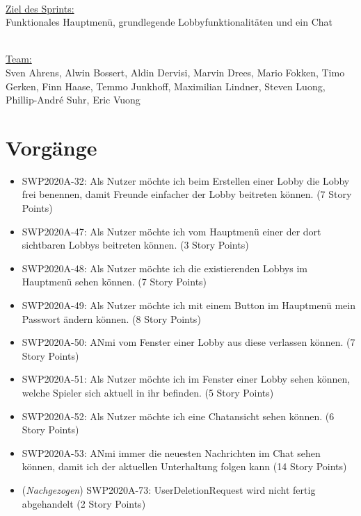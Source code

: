 \documentclass[12pt,a4paper, oneside]{article}
\begin{document}
    \noindent
    \\
    \underline{Ziel des Sprints:}
    \\
    Funktionales Hauptmenü, grundlegende Lobbyfunktionalitäten und ein Chat

    \noindent
    \\
    \underline {Team:}
    \\
    Sven Ahrens, Alwin Bossert, Aldin Dervisi, Marvin Drees, Mario Fokken,
    Timo Gerken, Finn Haase, Temmo Junkhoff, Maximilian Lindner, Steven Luong, Phillip-André Suhr, Eric Vuong


    \section{Vorgänge}

    \begin{itemize}

        \item SWP2020A-32: Als Nutzer möchte ich beim Erstellen einer Lobby die Lobby frei benennen, damit Freunde einfacher der Lobby beitreten können. (7 Story Points)

        \item SWP2020A-47: Als Nutzer möchte ich vom Hauptmenü einer der dort sichtbaren Lobbys beitreten können. (3 Story Points)

        \item SWP2020A-48: Als Nutzer möchte ich die existierenden Lobbys im Hauptmenü sehen können. (7 Story Points)

        \item SWP2020A-49: Als Nutzer möchte ich mit einem Button im Hauptmenü mein Passwort ändern können. (8 Story Points)

        \item SWP2020A-50: ANmi vom Fenster einer Lobby aus diese verlassen können. (7 Story Points)

        \item SWP2020A-51: Als Nutzer möchte ich im Fenster einer Lobby sehen können, welche Spieler sich aktuell in ihr befinden. (5 Story Points)

        \item SWP2020A-52: Als Nutzer möchte ich eine Chatansicht sehen können. (6 Story Points)

        \item SWP2020A-53: ANmi immer die neuesten Nachrichten im Chat sehen können, damit ich der aktuellen Unterhaltung folgen kann (14 Story Points)

        \item (\textit{Nachgezogen}) SWP2020A-73: UserDeletionRequest wird nicht fertig abgehandelt (2 Story Points)
    \end{itemize}
\end{document}
